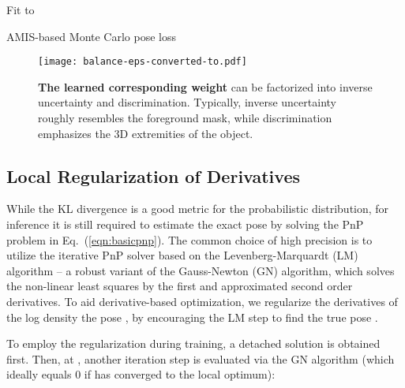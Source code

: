 \documentclass[10pt,twocolumn,letterpaper]{article}
\begin{document}
\begin{algorithm}[t]
\DontPrintSemicolon
  \KwIn{}
  \KwOut{}
  Fit  to  
  
  

\caption{AMIS-based Monte Carlo pose loss}
\label{amisalg}
\end{algorithm}

\begin{figure}[t]
\vspace{-1.0ex}
\begin{center}
    \texttt{[image: balance-eps-converted-to.pdf]}
\end{center}
\vspace{-1.2ex}
\caption{\textbf{The learned corresponding weight} can be factorized into inverse uncertainty and discrimination. 
Typically, inverse uncertainty roughly resembles the foreground mask, while discrimination emphasizes the 3D extremities of the object.
}
\label{fig:balance}
\end{figure}

\subsection{Local Regularization of Derivatives} \label{localreg}

While the KL divergence is a good metric for the probabilistic distribution, for inference it is still required to estimate the exact pose  by solving the PnP problem in Eq.~(\ref{eqn:basicpnp}). The common choice of high precision is to utilize the iterative PnP solver based on the 
Levenberg-Marquardt (LM) algorithm -- a robust variant of the Gauss-Newton (GN) algorithm, which solves the non-linear least squares by the first and approximated second order derivatives. 
To aid derivative-based optimization, we regularize the derivatives of the log density  \wrt the pose , by encouraging the LM step  to find the true pose .

To employ the regularization during training, a detached solution  is obtained first. Then, at , another iteration step is evaluated via the GN algorithm (which ideally equals 0 if  has converged to the local optimum):
\end{document}
